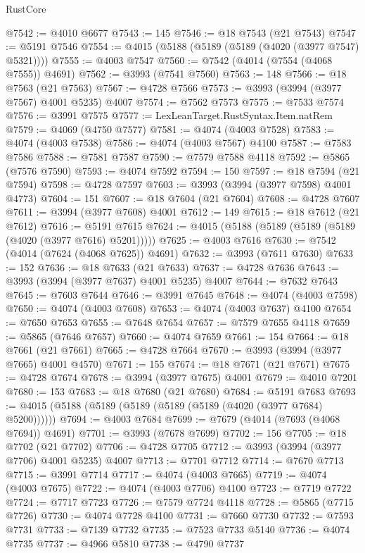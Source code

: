 \begin{lexlean}{RustCore}
\begin{coremodule}
@7542 := @4010 @6677
@7543 := 145
@7546 := @18 @7543 (@21 @7543)
@7547 := @5191 @7546
@7554 := @4015 (@5188 (@5189 (@5189 (@4020 (@3977 @7547) @5321))))
@7555 := @4003 @7547
@7560 := @7542 (@4014 (@7554 (@4068 @7555)) @4691)
@7562 := @3993 (@7541 @7560)
@7563 := 148
@7566 := @18 @7563 (@21 @7563)
@7567 := @4728 @7566
@7573 := @3993 (@3994 (@3977 @7567) @4001 @5235) @4007
@7574 := @7562 @7573
@7575 := @7533 @7574
@7576 := @3991 @7575
@7577 := LexLeanTarget.RustSyntax.Item.natRem
@7579 := @4069 (@4750 @7577)
@7581 := @4074 (@4003 @7528)
@7583 := @4074 (@4003 @7538)
@7586 := @4074 (@4003 @7567) @4100
@7587 := @7583 @7586
@7588 := @7581 @7587
@7590 := @7579 @7588 @4118
@7592 := @5865 (@7576 @7590)
@7593 := @4074 @7592
@7594 := 150
@7597 := @18 @7594 (@21 @7594)
@7598 := @4728 @7597
@7603 := @3993 (@3994 (@3977 @7598) @4001 @4773)
@7604 := 151
@7607 := @18 @7604 (@21 @7604)
@7608 := @4728 @7607
@7611 := @3994 (@3977 @7608) @4001
@7612 := 149
@7615 := @18 @7612 (@21 @7612)
@7616 := @5191 @7615
@7624 := @4015 (@5188 (@5189 (@5189 (@5189 (@4020 (@3977 @7616) @5201)))))
@7625 := @4003 @7616
@7630 := @7542 (@4014 (@7624 (@4068 @7625)) @4691)
@7632 := @3993 (@7611 @7630)
@7633 := 152
@7636 := @18 @7633 (@21 @7633)
@7637 := @4728 @7636
@7643 := @3993 (@3994 (@3977 @7637) @4001 @5235) @4007
@7644 := @7632 @7643
@7645 := @7603 @7644
@7646 := @3991 @7645
@7648 := @4074 (@4003 @7598)
@7650 := @4074 (@4003 @7608)
@7653 := @4074 (@4003 @7637) @4100
@7654 := @7650 @7653
@7655 := @7648 @7654
@7657 := @7579 @7655 @4118
@7659 := @5865 (@7646 @7657)
@7660 := @4074 @7659
@7661 := 154
@7664 := @18 @7661 (@21 @7661)
@7665 := @4728 @7664
@7670 := @3993 (@3994 (@3977 @7665) @4001 @4570)
@7671 := 155
@7674 := @18 @7671 (@21 @7671)
@7675 := @4728 @7674
@7678 := @3994 (@3977 @7675) @4001
@7679 := @4010 @7201
@7680 := 153
@7683 := @18 @7680 (@21 @7680)
@7684 := @5191 @7683
@7693 := @4015 (@5188 (@5189 (@5189 (@5189 (@5189 (@4020 (@3977 @7684) @5200))))))
@7694 := @4003 @7684
@7699 := @7679 (@4014 (@7693 (@4068 @7694)) @4691)
@7701 := @3993 (@7678 @7699)
@7702 := 156
@7705 := @18 @7702 (@21 @7702)
@7706 := @4728 @7705
@7712 := @3993 (@3994 (@3977 @7706) @4001 @5235) @4007
@7713 := @7701 @7712
@7714 := @7670 @7713
@7715 := @3991 @7714
@7717 := @4074 (@4003 @7665)
@7719 := @4074 (@4003 @7675)
@7722 := @4074 (@4003 @7706) @4100
@7723 := @7719 @7722
@7724 := @7717 @7723
@7726 := @7579 @7724 @4118
@7728 := @5865 (@7715 @7726)
@7730 := @4074 @7728 @4100
@7731 := @7660 @7730
@7732 := @7593 @7731
@7733 := @7139 @7732
@7735 := @7523 @7733 @5140
@7736 := @4074 @7735
@7737 := @4966 @5810
@7738 := @4790 @7737

\end{coremodule}
\end{lexlean}
